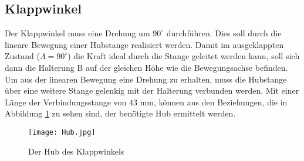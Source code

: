 \subsection{Klappwinkel}
Der Klappwinkel muss eine Drehung um $90^\circ$ durchführen. Dies soll durch die lineare Bewegung einer Hubstange realisiert werden. Damit im ausgeklappten Zustand ($\Lambda = 90^\circ$) die Kraft ideal durch die Stange geleitet werden kann, soll sich dann die Halterung B auf der gleichen Höhe wie die Bewegungsachse befinden. Um aus der linearen Bewegung eine Drehung zu erhalten, muss die Hubstange über eine weitere Stange gelenkig mit der Halterung verbunden werden. Mit einer Länge der Verbindungsstange von $43$ mm, können aus den Beziehungen, die in Abbildung \ref{abb_hub} zu sehen sind, der benötigte Hub ermittelt werden.
\begin{figure}[h]
	\centering
	\texttt{[image: Hub.jpg]}
	\caption{Der Hub des Klappwinkels}
	\label{abb_hub}
\end{figure}\\
